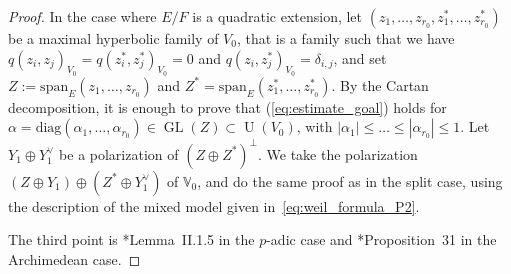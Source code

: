 \documentclass[letterpaper,11pt]{amsart}
\newcommand{\bV}{\mathbb{V}}
\newcommand{\<}{\negthickspace}
\newcommand{\valP}[1]{\left|#1\right|}
\DeclareMathOperator{\GL}{GL}
\DeclareMathOperator{\U}{U}
\theoremstyle{definition}
\theoremstyle{plain}
\theoremstyle{remark}
\numberwithin{equation}{section}
\begin{document}
\begin{proof}
In the case where $E/F$ is a quadratic extension, let $(z_1, \hdots, z_{r_0}, z_1^*, \hdots, z_{r_0}^*)$ be a maximal hyperbolic family of $V_0$, that is a family such that we have $ q(z_i,z_j)_{V_0}=q(z_i^*, z_j^* )_{V_0}=0$ and $ q(z_i,z_j^*)_{V_0}= \delta_{i,j}$, and set $Z:=\mathrm{span}_E(z_1,\hdots,z_{r_0})$ and $Z^*=\mathrm{span}_E(z_1^*,\hdots,z_{r_0}^*)$. By the Cartan decomposition, it is enough to prove that (\ref{eq:estimate_goal}) holds for $\alpha=\mathrm{diag}(\alpha_1, \hdots, \alpha_{r_0}) \in \GL(Z) \subset \U(V_0)$, with $\valP{\alpha_1} \leq \hdots \leq \valP{\alpha_{r_0}} \leq 1$. Let $Y_1 \oplus Y_1^\vee$ be a polarization of $(Z\oplus Z^*)^\perp$. We take the polarization $(Z \oplus Y_1) \oplus (Z^* \oplus Y_1^\vee)$ of $\bV_0$, and do the same proof as in the split case, using the description of the mixed model given in~\eqref{eq:weil_formula_P2}.


The third point is \cite{Wald}*{Lemma~II.1.5} in the $p$-adic case and \cite{Va}*{Proposition~31} in the Archimedean case.


\end{proof}
\end{document}

